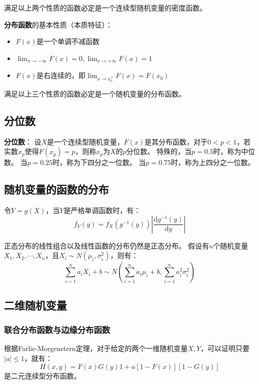 \documentclass[a4paper,12pt]{ctexart}
\begin{document}
满足以上两个性质的函数必定是一个连续型随机变量的密度函数。

\textbf{分布函数}的基本性质（本质特征）：
\begin{itemize}
	\item $F(x)$是一个单调不减函数
	\item $\lim_{x\rightarrow-\infty}F(x) = 0,\lim_{x\rightarrow+\infty}F(x) = 1$
	\item $F(x)$是右连续的，即$\lim_{x\rightarrow x_0^+}F(x) = F(x_0)$
\end{itemize}

满足以上三个性质的函数必定是一个随机变量的分布函数。

\subsection{分位数}

\textbf{分位数}：
设$X$是一个连续型随机变量，$F(x)$是其分布函数，对于$0<p<1$，若实数$x_p$使得$F(x_p) = p$，则称$x_p$为$X$的$p$分位数。
特殊的，当$p = 0.5$时，称为中位数。
当$p = 0.25$时，称为下四分之一位数。
当$p = 0.75$时，称为上四分之一位数。

\subsection{随机变量的函数的分布}

令$Y = g(X)$，当$Y$是严格单调函数时，有：
\begin{equation*}
	f_Y(y) = f_X(g^{-1}(y))\left|\frac{\mathrm{d}g^{-1}(y)}{\mathrm{d}y}\right|
\end{equation*}

正态分布的线性组合以及线性函数的分布仍然是正态分布。
假设有$n$个随机变量$X_1,X_2,\cdots,X_n$，且$X_i\sim N(\mu_i,\sigma_i^2)$，则有：
\begin{equation*}
	\sum_{i=1}^n a_i X_i + b \sim N\left(\sum_{i=1}^n a_i\mu_i + b, \sum_{i=1}^n a_i^2\sigma_i^2\right)
\end{equation*}

\subsection{二维随机变量}

\subsubsection{联合分布函数与边缘分布函数}

根据Farlie-Morgenstern定理，对于给定的两个一维随机变量$X,Y$，可以证明只要$|a| \leq 1$，就有：
\begin{equation*}
	H(x,y) = F(x)G(y) {1 + a[1 - F(x)][1 - G(y)]}
\end{equation*}
是二元连续型分布函数。
\end{document}
